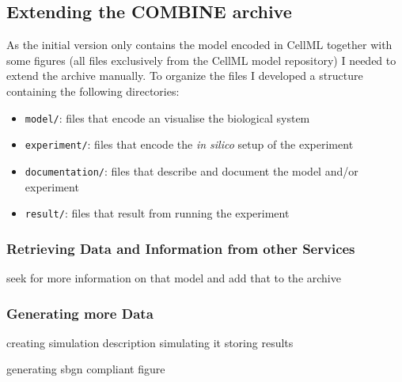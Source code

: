 \subsection{Extending the COMBINE archive}
As the initial version only contains the model encoded in CellML together with some figures (all files exclusively from the CellML model repository) I needed to extend the archive manually.
To organize the files I developed a structure containing the following directories:
\begin{itemize}
 \item \texttt{model/}: files that encode an visualise the biological system
 \item \texttt{experiment/}: files that encode the \textit{in silico} setup of the experiment
 \item \texttt{documentation/}: files that describe and document the model and/or experiment
 \item \texttt{result/}: files that result from running the experiment
\end{itemize}



\subsubsection{Retrieving Data and Information from other Services}
seek for more information on that model
and add that to the archive

\subsubsection{Generating more Data}
creating simulation description
simulating it
storing results

generating sbgn compliant figure




